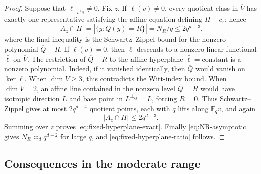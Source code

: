 \documentclass[11pt,letterpaper]{amsart}
\theoremstyle{definition}
\theoremstyle{remark}
\newcommand{\1}{\mathbf 1}
\begin{document}
\begin{proof}
Suppose that $\ell|_{v^{\perp_Q}}\ne0$.  Fix $z$.  If $\ell(v)\ne0$, every quotient class in $\overline V$ has exactly one representative satisfying the affine equation defining $H-c_z$; hence
\[
 |A_z\cap H|= |\{\bar y:\overline Q(\bar y)=R\}|=N_R/q\le2q^{d-3},
\]
where the final inequality is the Schwartz--Zippel bound for the nonzero polynomial $\overline Q-R$.  If $\ell(v)=0$, then $\ell$ descends to a nonzero linear functional $\bar\ell$ on $\overline V$.  The restriction of $\overline Q-R$ to the affine hyperplane $\bar\ell=\text{constant}$ is a nonzero polynomial.  Indeed, if it vanished identically, then $\overline Q$ would vanish on $\ker\bar\ell$.  When $\dim\overline V\ge3$, this contradicts the Witt-index bound.  When $\dim\overline V=2$, an affine line contained in the nonzero level $\overline Q=R$ would have isotropic direction $L$ and base point in $L^{\perp_Q}=L$, forcing $R=0$.  Thus Schwartz--Zippel gives at most $2q^{d-4}$ quotient points, each with $q$ lifts along $\mathbb F_q v$, and again
\[
 |A_z\cap H|\le2q^{d-3}.
\]
Summing over $z$ proves \eqref{eq:fixed-hyperplane-exact}.  Finally \eqref{eq:NR-asymptotic} gives $N_R\asymp_d q^{d-2}$ for large $q$, and \eqref{eq:fixed-hyperplane-ratio} follows.
\end{proof}

\subsection{Consequences in the moderate range}
\end{document}
